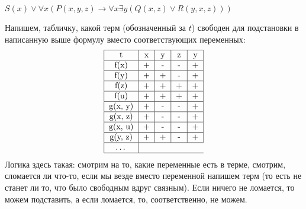 \documentclass[main]{subfiles}
\begin{document}
\begin{example}
    $S(x) \lor \forall x(P(x,y,z) \to \forall x\exists y(Q(x,z) \lor R(y,x,z)))$

    Напишем, табличку, какой терм (обозначенный за $t$) свободен для подстановки в написанную выше формулу вместо соответствующих переменных:
    \begin{gather*}
        \begin{tabular}{|c|c|c|c|c|}
            \hline
            t       & x & y & z & y \\
            \hline
            f(x)    & + & - & - & + \\
            \hline
            f(y)    & + & + & - & + \\
            \hline
            f(z)    & + & + & + & + \\
            \hline
            f(u)    & + & + & + & + \\
            \hline
            g(x, y) & + & - & - & + \\
            \hline
            g(x, z) & + & - & - & + \\
            \hline
            g(x, u) & + & - & - & + \\
            \hline
            g(y, z) & + & + & - & + \\
            \hline
            \dots                   \\
            \hline
        \end{tabular}
    \end{gather*}
    Логика здесь такая: смотрим на то, какие переменные есть в терме, смотрим, сломается ли что-то, если мы везде вместо переменной напишем терм (то есть не станет ли то, что было свободным вдруг связным). Если ничего не ломается, то можем подставить, а если ломается, то, соответственно, не можем.
\end{example}
\end{document}
